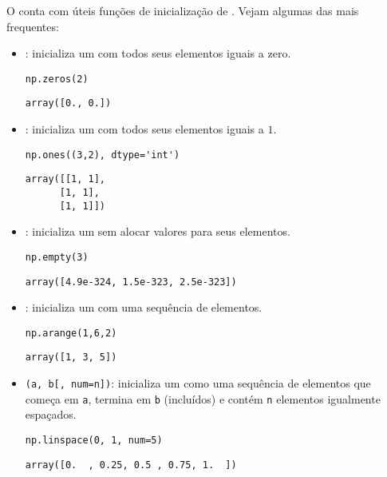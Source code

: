 O {\numpy} conta com úteis funções de inicialização de {\PYTHONnumpyDOTarray}. Vejam algumas das mais frequentes:
\begin{itemize}
\item \hl{\PYTHONnumpyDOTzeros}: inicializa um {\PYTHONnumpyDOTarray} com todos seus elementos iguais a zero.
  
\begin{lstlisting}
np.zeros(2)
\end{lstlisting}

\begin{verbatim}
array([0., 0.])
\end{verbatim}

  \item \hl{\PYTHONnumpyDOTones}: inicializa um {\PYTHONnumpyDOTarray} com todos seus elementos iguais a $1$.

\begin{lstlisting}
np.ones((3,2), dtype='int')
\end{lstlisting}

\begin{verbatim}
array([[1, 1],
      [1, 1],
      [1, 1]])
\end{verbatim}

  \item \hl{\PYTHONnumpyDOTempty}: inicializa um {\PYTHONnumpyDOTarray} sem alocar valores para seus elementos.
  
\begin{lstlisting}
np.empty(3)
\end{lstlisting}

\begin{verbatim}
array([4.9e-324, 1.5e-323, 2.5e-323])
\end{verbatim}

  \item \hl{\PYTHONnumpyDOTarange}: inicializa um {\PYTHONnumpyDOTarray} com uma sequência de elementos.

\begin{lstlisting}
np.arange(1,6,2)
\end{lstlisting}

\begin{verbatim}
array([1, 3, 5])
\end{verbatim}

  \item \hl{\PYTHONnumpyDOTlinspace}\texttt{(a, b[, num=n])}: inicializa um {\PYTHONnumpyDOTarray} como uma sequência de elementos que começa em \texttt{a}, termina em \texttt{b} (incluídos) e contém \texttt{n} elementos igualmente espaçados.

\begin{lstlisting}
np.linspace(0, 1, num=5)
\end{lstlisting}

\begin{verbatim}
array([0.  , 0.25, 0.5 , 0.75, 1.  ])
\end{verbatim}

\end{itemize}

